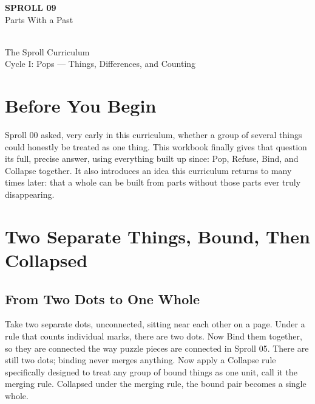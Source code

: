 \documentclass[11pt]{book}
\begin{document}
\begin{titlepage}
\centering
\vspace*{1.4in}
{\Huge \textbf{SPROLL 09}}\\[0.5in]
{\huge Parts With a Past}\\[0.8in]
\\[0.8in]
{\Large The Sproll Curriculum}\\[0.2in]
{\large Cycle I: Pops --- Things, Differences, and Counting}
\end{titlepage}

\tableofcontents

\chapter*{Before You Begin}

Sproll 00 asked, very early in this curriculum, whether a group of several things could honestly be treated as one thing. This workbook finally gives that question its full, precise answer, using everything built up since: Pop, Refuse, Bind, and Collapse together. It also introduces an idea this curriculum returns to many times later: that a whole can be built from parts without those parts ever truly disappearing.

\chapter{Two Separate Things, Bound, Then Collapsed}

\section{From Two Dots to One Whole}

Take two separate dots, unconnected, sitting near each other on a page. Under a rule that counts individual marks, there are two dots. Now Bind them together, so they are connected the way puzzle pieces are connected in Sproll 05. There are still two dots; binding never merges anything. Now apply a Collapse rule specifically designed to treat any group of bound things as one unit, call it the merging rule. Collapsed under the merging rule, the bound pair becomes a single whole.

\begin{center}
\end{center}
\end{document}
